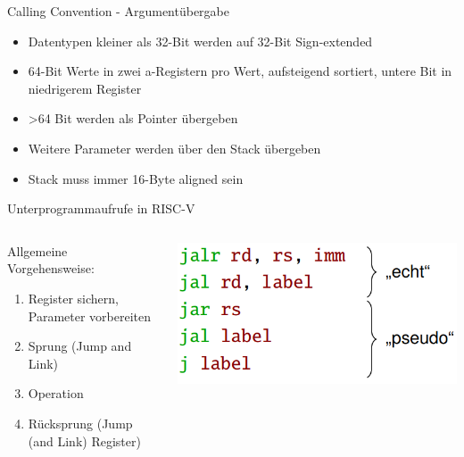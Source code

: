 \documentclass[
  german,            %
  aspectratio=169,    %
]{tumbeamer}
\begin{document}
  \begin{frame}[c]{Calling Convention - Argumentübergabe}                                    
	\begin{itemize}
	  \item Datentypen kleiner als 32-Bit werden auf 32-Bit Sign-extended
	  \item 64-Bit Werte in zwei a-Registern pro Wert, aufsteigend sortiert, untere Bit in niedrigerem Register
	  \item >64 Bit werden als Pointer übergeben
	  \item Weitere Parameter werden über den Stack übergeben
	  \item Stack muss immer 16-Byte aligned sein
   \end{itemize}                                          
  \end{frame}

  \begin{frame}[c]{Unterprogrammaufrufe in RISC-V}
	\begin{columns}[c]
	  \begin{column}{0.5\textwidth}
		Allgemeine Vorgehensweise:\\[.2cm] 
		\begin{enumerate}
		  \item Register sichern, Parameter vorbereiten
		  \item Sprung (Jump and Link)
		  \item Operation
		  \item Rücksprung (Jump (and Link) Register)
		\end{enumerate}
	  \end{column}
	  \begin{column}{0.4\textwidth}
		\includegraphics[width=\linewidth]{w03_jumpInstructionsWithPseudo_zue.png}
	  \end{column}
	\end{columns}
  \end{frame}
  
\end{document}
